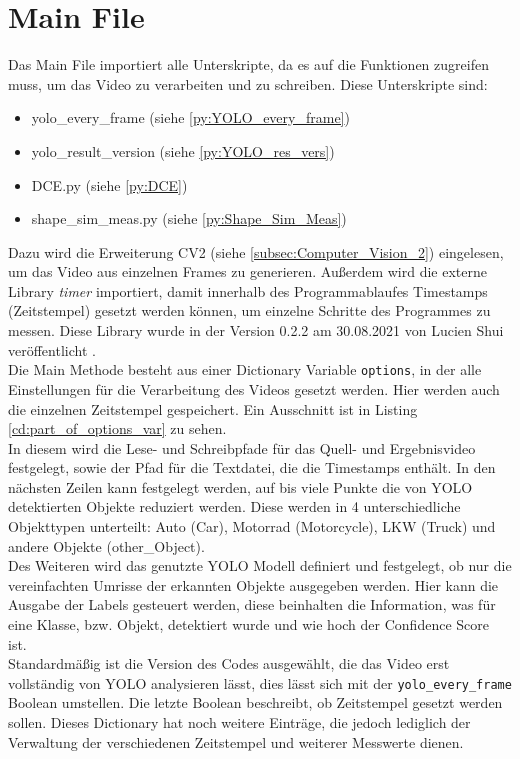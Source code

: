 \section{Main File}
{ 
	Das Main File importiert alle Unterskripte, da es auf die Funktionen zugreifen muss, um das Video zu verarbeiten und zu schreiben. Diese Unterskripte sind: 
	\begin{itemize}
		\item yolo\_every\_frame (siehe \ref{py:YOLO_every_frame})
		\item yolo\_result\_version (siehe \ref{py:YOLO_res_vers})
		\item DCE.py (siehe \ref{py:DCE})
		\item shape\_sim\_meas.py (siehe \ref{py:Shape_Sim_Meas})
	\end{itemize}
	Dazu wird die Erweiterung CV2 (siehe \ref{subsec:Computer_Vision_2}) eingelesen, um das Video aus einzelnen Frames zu generieren.
	Außerdem wird die externe Library \textit{timer} importiert, damit innerhalb des Programmablaufes Timestamps (Zeitstempel) gesetzt werden können, um einzelne Schritte des Programmes zu messen. Diese Library wurde in der Version 0.2.2 am 30.08.2021 von Lucien Shui veröffentlicht \citep{Shui2021}.  \\
	Die Main Methode besteht aus einer Dictionary Variable \lstinline|options|, in der alle Einstellungen für die Verarbeitung des Videos gesetzt werden. Hier werden auch die einzelnen Zeitstempel gespeichert. Ein Ausschnitt ist in Listing \ref{cd:part_of_options_var} zu sehen. \\
	In diesem wird die Lese- und Schreibpfade für das Quell- und Ergebnisvideo festgelegt, sowie der Pfad für die Textdatei, die die Timestamps enthält. In den nächsten Zeilen kann festgelegt werden, auf bis viele Punkte die von YOLO detektierten Objekte reduziert werden. Diese werden in 4 unterschiedliche Objekttypen unterteilt: Auto (Car), Motorrad (Motorcycle), LKW (Truck) und andere Objekte (other\_Object). \\
	Des Weiteren wird das genutzte YOLO Modell definiert und festgelegt, ob nur die vereinfachten Umrisse der erkannten Objekte ausgegeben werden. Hier kann die Ausgabe der Labels gesteuert werden, diese beinhalten die Information, was für eine Klasse, bzw. Objekt, detektiert wurde und wie hoch der Confidence Score ist. \\
	Standardmäßig ist die Version des Codes ausgewählt, die das Video erst vollständig von YOLO analysieren lässt, dies lässt sich mit der \lstinline|yolo_every_frame| Boolean umstellen. Die letzte Boolean beschreibt, ob Zeitstempel gesetzt werden sollen. Dieses Dictionary hat noch weitere Einträge, die jedoch lediglich der Verwaltung der verschiedenen Zeitstempel und weiterer Messwerte dienen. \\
	

}
